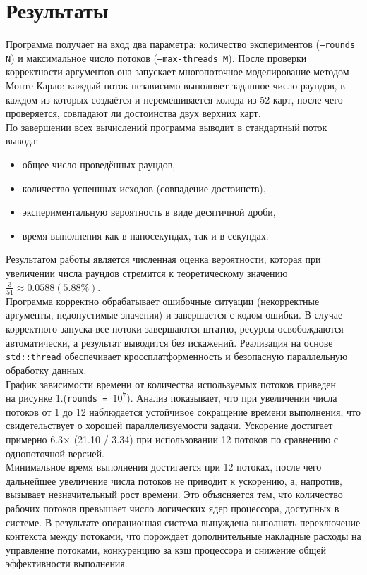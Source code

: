 \section{Результаты}

Программа получает на вход два параметра: количество экспериментов (\texttt{--rounds N}) и максимальное число потоков (\texttt{--max-threads M}). После проверки корректности аргументов она запускает многопоточное моделирование методом Монте-Карло: каждый поток независимо выполняет заданное число раундов, в каждом из которых создаётся и перемешивается колода из 52 карт, после чего проверяется, совпадают ли достоинства двух верхних карт.\\
По завершении всех вычислений программа выводит в стандартный поток вывода:
\begin{itemize}
    \item общее число проведённых раундов,
    \item количество успешных исходов (совпадение достоинств),
    \item экспериментальную вероятность в виде десятичной дроби,
    \item время выполнения как в наносекундах, так и в секундах.
\end{itemize}
Результатом работы является численная оценка вероятности, которая при увеличении числа раундов стремится к теоретическому значению $\frac{3}{51} \approx 0.0588 (5.88\%)$.\\
Программа корректно обрабатывает ошибочные ситуации (некорректные аргументы, недопустимые значения) и завершается с кодом ошибки. В случае корректного запуска все потоки завершаются штатно, ресурсы освобождаются автоматически, а результат выводится без искажений. Реализация на основе \texttt{std::thread} обеспечивает кроссплатформенность и безопасную параллельную обработку данных.\\
График зависимости времени от количества используемых потоков приведен \\на рисунке 1.(\texttt{rounds = $10^7$}).
Анализ показывает, что при увеличении числа потоков от 1 до 12 наблюдается устойчивое сокращение времени выполнения, что свидетельствует о хорошей параллелизуемости задачи. Ускорение достигает примерно 6.3× (21.10 / 3.34) при использовании 12 потоков по сравнению с однопоточной версией.\\
Минимальное время выполнения достигается при 12 потоках, после чего дальнейшее увеличение числа потоков не приводит к ускорению, а, напротив, вызывает незначительный рост времени. Это объясняется тем, что количество рабочих потоков превышает число логических ядер процессора, доступных в системе. В результате операционная система вынуждена выполнять переключение контекста между потоками, что порождает дополнительные накладные расходы на управление потоками, конкуренцию за кэш процессора и снижение общей эффективности выполнения.\\
